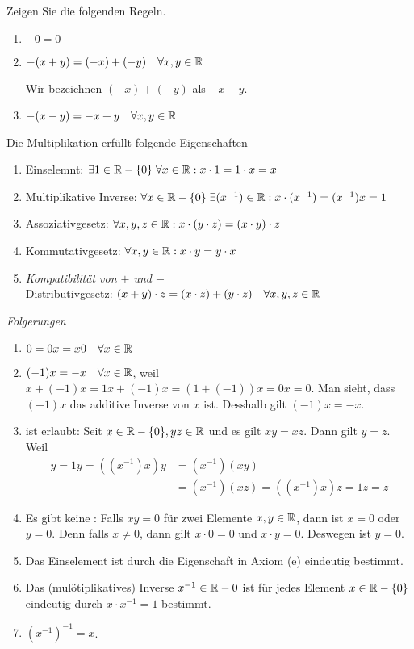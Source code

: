 \begin{imp-ex}
  Zeigen Sie die folgenden Regeln.
  \begin{enumerate}
    \item $-0=0$
    \item $-(x+y)=(-x)+(-y)  \quad \forall x,y \in \mathbb{R}$

    Wir bezeichnen $(-x)+(-y)$ als $-x-y$.
    \item $-(x-y)=-x+y \quad \forall x,y \in \mathbb{R}$
  \end{enumerate}
\end{imp-ex}

Die Multiplikation erfüllt folgende Eigenschaften
\begin{enumerate}
  \item Einselemnt: $\exists 1 \in \mathbb{R} - \{0\} \; \forall x \in \mathbb{R}: x \cdot 1 = 1 \cdot x = x$
  \item Multiplikative Inverse: $\forall x \in \mathbb{R} - \{0\} \; \exists (x^{-1}) \in \mathbb{R}: x \cdot (x^{-1}) = (x^{-1})x = 1$
  \item  Assoziativgesetz: $\forall x,y,z \in \mathbb{R}: x \cdot (y \cdot z) = (x \cdot y) \cdot z$
  \item Kommutativgesetz: $\forall x,y \in \mathbb{R}: x \cdot y = y \cdot x$
  \item \emph{Kompatibilität von $+$ und $-$} \\
  Distributivgesetz: $(x+y)\cdot z = (x \cdot z) + (y \cdot z) \quad \forall x,y,z \in \mathbb{R}$
\end{enumerate}

\emph{Folgerungen}
\begin{enumerate}
  \item $0 = 0x = x0 \quad \forall x \in \mathbb{R}$
  \item $(-1)x = -x \quad \forall x \in \mathbb{R}$, weil $x + (-1) x = 1x + (-1)x = (1+(-1))x = 0x = 0$. Man sieht, dass $(-1)x$ das additive Inverse von $x$ ist. Desshalb gilt $(-1)x = -x$.
  \item {} ist erlaubt: Seit $x \in \mathbb{R} - \{0\}, yz \in \mathbb{R}$ und es gilt $xy=xz$. Dann gilt $y=z$. Weil
  \[
  \begin{aligned}
   y=1y=((x^{-1})x)y&=(x^{-1})(xy)\\
   &=(x^{-1})(xz)=((x^{-1})x)z=1z = z
  \end{aligned}
  \]
  \item Es gibt keine : Falls $xy=0$ für zwei Elemente $x,y \in \mathbb{R}$, dann ist $x=0$ oder $y=0$. Denn falls $x \neq 0$, dann gilt $x \cdot 0 = 0$ und $x \cdot y = 0$. Deswegen ist $y=0$.
  \item Das Einselement ist durch die Eigenschaft in Axiom (e) eindeutig bestimmt.
  \item Das (mulötiplikatives) Inverse $x^{-1} \in \mathbb{R} - {0}$  ist für jedes Element $x \in \mathbb{R} - \{0\}$ eindeutig durch $x \cdot x^{-1} = 1$ bestimmt.
  \item $(x^{-1})^{-1} = x$.
\end{enumerate}

